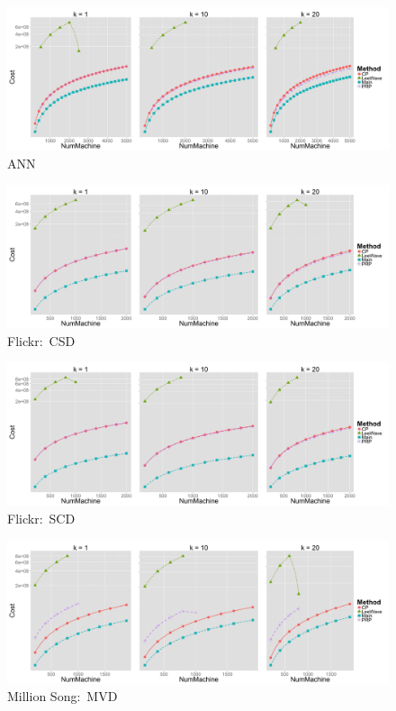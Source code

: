 \begin{figure}[htpb!]
  \centering
  \includegraphics[width=1.0\linewidth]{exp/out/ANN.png}
  \caption{ANN}
  \label{fig:out_ANN}
\end{figure}

\begin{figure}[htpb!]
  \centering
  \includegraphics[width=1.0\linewidth]{exp/out/f2.png}
  \caption{Flickr:~CSD}
  \label{fig:out_f2}
\end{figure}

\begin{figure}[htpb!]
  \centering
  \includegraphics[width=1.0\linewidth]{exp/out/f3.png}
  \caption{Flickr:~SCD}
  \label{fig:out_f3}
\end{figure}

\begin{figure}[htpb!]
  \centering
  \includegraphics[width=1.0\linewidth]{exp/out/mvd.png}
  \caption{Million Song:~MVD}
  \label{fig:out_mvd}
\end{figure}

